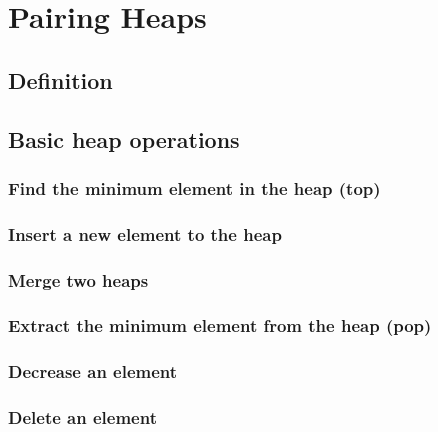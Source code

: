 \documentclass{article}
\begin{document}
\section{Pairing Heaps}
\label{pairing-heap}

\subsection{Definition}

\subsection{Basic heap operations}

\subsubsection{Find the minimum element in the heap (top)}

\subsubsection{Insert a new element to the heap}

\subsubsection{Merge two heaps}

\subsubsection{Extract the minimum element from the heap (pop)}

\subsubsection{Decrease an element}

\subsubsection{Delete an element}

\end{document}
